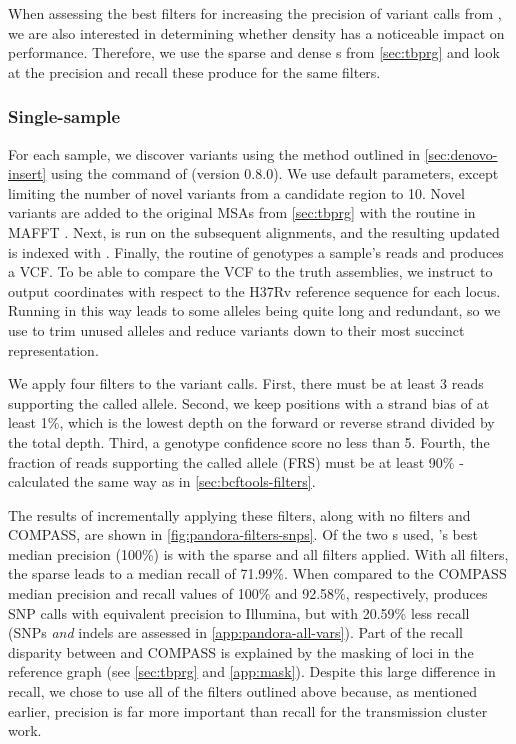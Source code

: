 When assessing the best filters for increasing the precision of variant calls from \pandora{}, we are also interested in determining whether \prg{} density has a noticeable impact on performance. Therefore, we use the sparse and dense \prg{}s from \autoref{sec:tbprg} and look at the precision and recall these produce for the same filters.

\subsubsection{Single-sample}
\label{sec:map-var-calls}

For each sample, we discover \denovo{} variants using the method outlined in \autoref{sec:denovo-insert} using the  command of \pandora{} (version 0.8.0). We use default parameters, except limiting the number of novel variants from a candidate region to 10. Novel variants are added to the original MSAs from \autoref{sec:tbprg} with the  routine in MAFFT \cite{katoh2012}. Next, \makeprg{} is run on the subsequent alignments, and the resulting updated \prg{} is indexed with \pandora{}. Finally, the  routine of \pandora{} genotypes a sample's reads and produces a VCF. To be able to compare the \pandora{} VCF to the truth assemblies, we instruct \pandora{} to output coordinates with respect to the H37Rv reference sequence for each locus. Running \pandora{} in this way leads to some alleles being quite long and redundant, so we use  to trim unused alleles and reduce variants down to their most succinct representation. 

We apply four filters to the \pandora{} variant calls. First, there must be at least 3 reads supporting the called allele. Second, we keep positions with a strand bias of at least 1\%, which is the lowest depth on the forward or reverse strand divided by the total depth. Third, a genotype confidence score no less than 5. Fourth, the fraction of reads supporting the called allele (FRS) must be at least 90\%  - calculated the same way as in \autoref{sec:bcftools-filters}.

The results of incrementally applying these filters, along with no filters and COMPASS, are shown in \autoref{fig:pandora-filters-snps}. Of the two \prg{}s used, \pandora{}'s best median precision (100\%) is with the sparse \prg{} and all filters applied. With all filters, the sparse \prg{} leads to a median recall of 71.99\%. When compared to the COMPASS median precision and recall values of 100\% and 92.58\%, respectively, \pandora{} produces \ont{} SNP calls with equivalent precision to Illumina, but with 20.59\% less recall (SNPs \emph{and} indels are assessed in \autoref{app:pandora-all-vars}). Part of the recall disparity between \pandora{} and COMPASS is explained by the masking of loci in the reference graph (see \autoref{sec:tbprg} and \autoref{app:mask}). Despite this large difference in recall, we chose to use all of the filters outlined above because, as mentioned earlier, precision is far more important than recall for the transmission cluster work.

